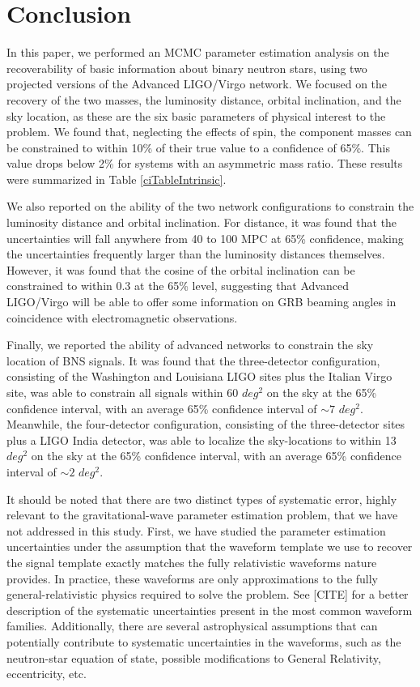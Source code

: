 \documentclass[11pt,a4paper]{emulateapj} 
\newcommand{\carl}[1]{{\color{red} #1}}
\begin{document}
\section{Conclusion}
\label{conclusionSection}

In this paper, we performed an MCMC parameter estimation analysis on
the recoverability of basic information about binary neutron stars,
using two projected versions of the Advanced LIGO/Virgo network.  We
focused on the recovery of the two masses, the luminosity distance,
orbital inclination, and the sky location, as these are the six basic
parameters of physical interest to the problem.  We found that,
neglecting the effects of spin, the component masses can be
constrained to within 10\% of their true value to a confidence of
65\%.  This value drops below 2\% for systems with an asymmetric mass
ratio.  These results were summarized in Table \ref{ciTableIntrinsic}.
 
We also reported on the ability of the two network configurations to
constrain the luminosity distance and orbital inclination.  For
distance, it was found that the uncertainties will fall anywhere from
40 to 100 MPC at 65\% confidence, making the uncertainties frequently
larger than the luminosity distances themselves.  However, it was
found that the cosine of the orbital inclination can be constrained to
within 0.3 at the 65\% level, suggesting that Advanced LIGO/Virgo will
be able to offer some information on GRB beaming angles in coincidence
with electromagnetic observations.

Finally, we reported the ability of advanced networks to constrain the
sky location of BNS signals.  It was found that the three-detector
configuration, consisting of the Washington and Louisiana LIGO sites
plus the Italian Virgo site, was able to constrain all signals within
60 $deg^2$ on the sky at the 65\% confidence interval, with an average
65\% confidence interval of $\sim 7$ $deg^2$.  Meanwhile, the
four-detector configuration, consisting of the three-detector sites
plus a LIGO India detector, was able to localize the sky-locations to
within 13 $deg^2$ on the sky at the 65\% confidence interval, with an
average 65\% confidence interval of $\sim 2$ $deg^2$.

It should be noted that there are two distinct types of systematic
error, highly relevant to the gravitational-wave parameter estimation
problem, that we have not addressed in this study.  First, we have
studied the parameter estimation uncertainties under the assumption
that the waveform template we use to recover the signal template
exactly matches the fully relativistic waveforms nature provides.  In
practice, these waveforms are only approximations to the fully
general-relativistic physics required to solve the problem.  See
\carl{[CITE]} for a better description of the systematic uncertainties
present in the most common waveform families.  Additionally, there are
several astrophysical assumptions that can potentially contribute to
systematic uncertainties in the waveforms, such as the neutron-star
equation of state, possible modifications to General Relativity,
eccentricity, etc.
\end{document}
